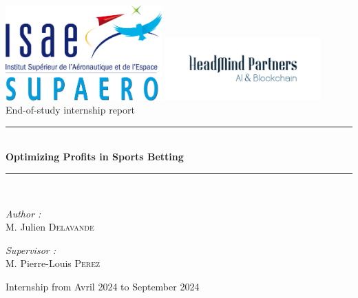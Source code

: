 
\begin{titlepage}

\begin{center}

\includegraphics[width=0.45\textwidth]{components/first_page/images/logo_isae.png}
\includegraphics[width=0.45\textwidth]{components/first_page/images/logo_headmind.png}  \\ [2cm]

{\large End-of-study internship report}\\[1cm]
\rule{\linewidth}{0.5mm} \\[0.4cm]
{ \huge \bfseries Optimizing Profits in Sports Betting \\[0.4cm] }
\rule{\linewidth}{0.5mm} \\[1.5cm]
\noindent
\begin{minipage}{0.4\textwidth}
  \begin{flushleft} \large
    \emph{Author :}\\
    M. Julien \textsc{Delavande}\\
  \end{flushleft}
\end{minipage}%
\begin{minipage}{0.4\textwidth}
  \begin{flushright} \large
    \emph{Supervisor :} \\
    M. Pierre-Louis \textsc{Perez}\\
  \end{flushright}
\end{minipage}
\vfill
{\large Internship from Avril 2024 to September 2024}
\end{center}
\end{titlepage}
